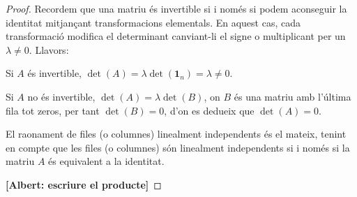 \documentclass[a4paper,12pt,twoside]{article}
\newcommand{\1}{\mathbf{1}}
\newcommand{\0}{\mathbf{0}}
\theoremstyle{definition}
\theoremstyle{remark}
\begin{document}
\begin{proof}
	Recordem que una matriu és invertible si i només si podem aconseguir la identitat mitjançant transformacions elementals. En aquest cas, cada transformació modifica el determinant canviant-li el signe o multiplicant per un $\lambda\neq 0$. Llavors:
	
	Si $A$ és invertible, $\det(A)=\lambda \det(\1_n)=\lambda \neq 0$.
	
	Si $A$ no és invertible, $\det(A)=\lambda \det(B)$, on $B$ és una matriu amb l'última fila tot zeros, per tant $\det(B)=0$, d'on es dedueix que $\det(A)=0$.
	
	El raonament de files (o columnes) linealment independents és el mateix, tenint en compte que les files (o columnes) són linealment independents si i només si la matriu $A$ és equivalent a la identitat.
	
	\textbf{[Albert: escriure el producte]}  
\end{proof}
\end{document}
